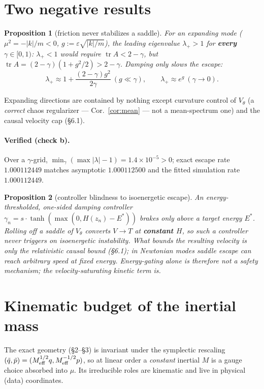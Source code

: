 \documentclass[11pt]{article}
\theoremstyle{plain}
\newtheorem{proposition}{Proposition}
\theoremstyle{definition}
\begin{document}
\section{Two negative results}
\begin{proposition}[friction never stabilizes a saddle]\label{prop:saddle}
For an expanding mode ($\mu^2=-|k|/m<0$, $g:=\varepsilon\sqrt{|k|/m}$), the leading eigenvalue $\lambda_+>1$ for \textbf{every} $\gamma\in[0,1)$: $\lambda_+<1$ would require $\operatorname{tr}A<2-\gamma$, but $\operatorname{tr}A=(2-\gamma)(1+g^2/2)>2-\gamma$. Damping only \emph{slows} the escape:
\[ \lambda_+\approx1+\frac{(2-\gamma)g^2}{2\gamma}\ (g\ll\gamma),\qquad \lambda_+\approx e^{g}\ (\gamma\to0). \]
\end{proposition}
Expanding directions are contained by nothing except curvature control of $V_\theta$ (a \emph{correct} chaos regularizer --- Cor.~\ref{cor:mean} --- not a mean-spectrum one) and the causal velocity cap (\S6.1).
\paragraph{Verified (check b).} Over a $\gamma$-grid, $\min_\gamma(\max|\lambda|-1)=1.4\times10^{-5}>0$; exact escape rate $1.000112449$ matches asymptotic $1.000112500$ and the fitted simulation rate $1.000112449$.

\begin{proposition}[controller blindness to isoenergetic escape]\label{prop:blind}
An energy-thresholded, one-sided damping controller $\gamma_n=s\cdot\tanh(\max(0,H(z_n)-E^*))$ brakes only above a target energy $E^*$. Rolling off a saddle of $V_\theta$ converts $V\to T$ at \textbf{constant $H$}, so such a controller never triggers on isoenergetic instability. What bounds the resulting velocity is \emph{only} the relativistic causal bound (\S6.1); in Newtonian modes saddle escape can reach arbitrary speed at fixed energy. Energy-gating alone is therefore not a safety mechanism; the velocity-saturating kinetic term is.
\end{proposition}

\section{Kinematic budget of the inertial mass}
The exact geometry (\S2--\S3) is invariant under the symplectic rescaling $(\tilde q,\tilde p)=(M_{\rm eff}^{1/2}q,M_{\rm eff}^{-1/2}p)$, so at linear order a \emph{constant} inertial $M$ is a gauge choice absorbed into $\mu$. Its irreducible roles are kinematic and live in physical (data) coordinates.
\end{document}
